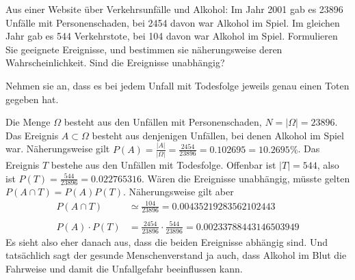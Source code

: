 Aus einer Website über Verkehrsunfälle und Alkohol: Im Jahr 2001
gab es 23896 Unfälle mit Personenschaden, bei 2454 davon war
Alkohol im Spiel. Im gleichen Jahr gab es 544 Verkehrstote, bei 104
davon war Alkohol im Spiel. Formulieren Sie geeignete Ereignisse, und
bestimmen sie näherungsweise deren Wahrscheinlichkeit. Sind die Ereignisse
unabhängig?

\begin{hinweis}
Nehmen sie an, dass es bei jedem Unfall mit Todesfolge jeweils
genau einen Toten gegeben hat.
\end{hinweis}

\begin{loesung}
Die Menge $\Omega$ besteht aus den Unfällen mit Personenschaden,
$N=|\Omega|=23896$. Das Ereignis $A\subset \Omega$ besteht aus denjenigen
Unfällen, bei denen Alkohol im Spiel war. Näherungsweise gilt $P(A)=\frac{|A|}{|\Omega|}=\frac{2454}{23896}=0.102695=10.2695\%$.
Das Ereignis $T$ bestehe aus den
Unfällen mit Todesfolge. Offenbar ist
$|T| = 544$, also ist $P(T) = \frac{544}{23896}=0.022765316$.
Wären die Ereignisse unabhängig, müsste gelten
$ P(A\cap T)=P(A)P(T) $. Näherungsweise gilt aber
\begin{align*}
P(A\cap T)&\simeq\frac{104}{23896}=0.00435219283562102443\\
\\
P(A)\cdot P(T)&=\frac{2454}{23896}\cdot\frac{544}{23896}=0.00233788443146503949
\end{align*}
Es sieht also eher danach aus, dass die beiden Ereignisse
abhängig sind. Und tatsächlich sagt der gesunde Menschenverstand ja auch,
dass Alkohol im Blut die Fahrweise und damit die Unfallgefahr beeinflussen
kann.
\end{loesung}

